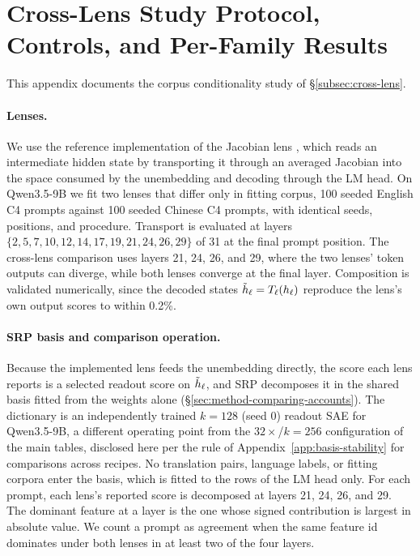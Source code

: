 \section{Cross-Lens Study Protocol, Controls, and Per-Family Results}
\label{app:cross-lens}

This appendix documents the corpus conditionality study of
\S\ref{subsec:cross-lens}.

\paragraph{Lenses.}
We use the reference implementation of the Jacobian lens
\citep{gurnee2026workspace}, which reads an intermediate hidden state by
transporting it through an averaged Jacobian into the space consumed by
the unembedding and decoding through the LM head. On Qwen3.5-9B we fit
two lenses that differ only in fitting corpus, 100 seeded English
C4 prompts against 100 seeded Chinese C4 prompts, with identical seeds,
positions, and procedure. Transport is evaluated at layers
\(\{2,5,7,10,12,14,17,19,21,24,26,29\}\) of 31 at the final prompt
position. The cross-lens comparison uses layers 21, 24, 26, and 29,
where the two lenses' token outputs can diverge, while both lenses converge at
the final layer. Composition is validated numerically, since
the decoded states \(\tilde h_\ell=T_\ell(h_\ell)\) reproduce the lens's own output scores
to within 0.2\%.

\paragraph{SRP basis and comparison operation.}
Because the implemented lens feeds the unembedding directly, the score
each lens reports is a selected readout score on \(\tilde h_\ell\),
and SRP decomposes it in the shared basis fitted from the weights alone
(\S\ref{sec:method-comparing-accounts}). The dictionary is an
independently trained \(k{=}128\) (seed 0) readout SAE for
Qwen3.5-9B, a different operating point from the
\(32\times\)/\(k{=}256\) configuration of the main tables, disclosed here per the
rule of Appendix~\ref{app:basis-stability} for comparisons across recipes. No translation
pairs, language labels, or fitting corpora enter the basis, which is
fitted to the rows of the LM head only. For each prompt, each lens's
reported score is decomposed at layers 21, 24, 26, and 29. The dominant
feature at a layer is the one whose signed contribution is largest in
absolute value. We count a prompt as agreement when the same feature id
dominates under both lenses in at least two of the four layers.

